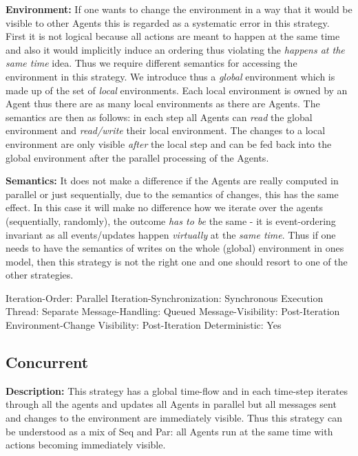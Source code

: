 \textbf{Environment:} If one wants to change the environment in a way that it would be visible to other Agents this is regarded as a systematic error in this strategy. First it is not logical because all actions are meant to happen at the same time and also it would implicitly induce an ordering thus violating the \textit{happens at the same time} idea. Thus we require different semantics for accessing the environment in this strategy. We introduce thus a \textit{global} environment which is made up of the set of \textit{local} environments. Each local environment is owned by an Agent thus there are as many local environments as there are Agents. The semantics are then as follows: in each step all Agents can \textit{read} the global environment and \textit{read/write} their local environment. The changes to a local environment are only visible \textit{after} the local step and can be fed back into the global environment after the parallel processing of the Agents.

\textbf{Semantics:} It does not make a difference if the Agents are really computed in parallel or just sequentially, due to the semantics of changes, this has the same effect. In this case it will make no difference how we iterate over the agents (sequentially, randomly), the outcome \textit{has to be} the same - it is event-ordering invariant as all events/updates happen \textit{virtually} at the \textit{same time}. Thus if one needs to have the semantics of writes on the whole (global) environment in ones model, then this strategy is not the right one and one should resort to one of the other strategies.

	Iteration-Order:			Parallel
	Iteration-Synchronization: 	Synchronous
	Execution Thread:			Separate
 	Message-Handling:			Queued
 	Message-Visibility:			Post-Iteration
 	Environment-Change Visibility:		Post-Iteration
 	Deterministic:				Yes
 	
\subsection{Concurrent}
\textbf{Description:} This strategy has a global time-flow and in each time-step iterates through all the agents and updates all Agents in parallel but all messages sent and changes to the environment are immediately visible. Thus this strategy can be understood as a mix of Seq and Par: all Agents run at the same time with actions becoming immediately visible.

